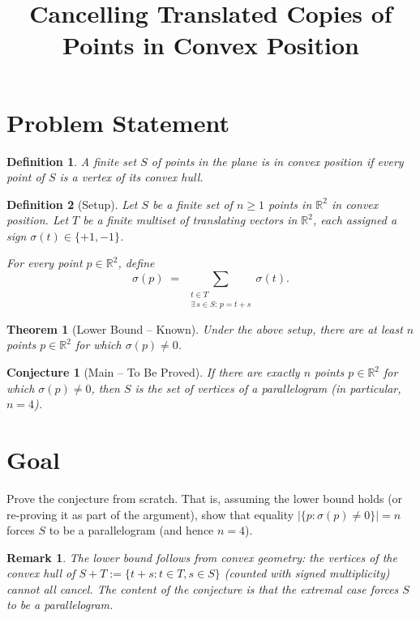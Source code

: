 \documentclass{article}
\title{Cancelling Translated Copies of Points in Convex Position}
\date{}
\newtheorem{theorem}{Theorem}
\newtheorem{conjecture}{Conjecture}
\newtheorem{definition}{Definition}
\newtheorem{remark}{Remark}
\begin{document}
\maketitle

\section*{Problem Statement}

\begin{definition}
A finite set $S$ of points in the plane is in \emph{convex position} if every point of $S$ is a vertex of its convex hull.
\end{definition}

\begin{definition}[Setup]
Let $S$ be a finite set of $n \geq 1$ points in $\mathbb{R}^2$ in convex position.
Let $T$ be a finite multiset of translating vectors in $\mathbb{R}^2$, each assigned a sign
$\sigma(t) \in \{+1, -1\}$.

For every point $p \in \mathbb{R}^2$, define
\[
  \sigma(p) \;=\; \sum_{\substack{t \in T \\ \exists\, s \in S: \, p = t + s}} \sigma(t).
\]
\end{definition}

\begin{theorem}[Lower Bound -- Known]
Under the above setup, there are at least $n$ points $p \in \mathbb{R}^2$ for which $\sigma(p) \neq 0$.
\end{theorem}

\begin{conjecture}[Main -- To Be Proved]
If there are exactly $n$ points $p \in \mathbb{R}^2$ for which $\sigma(p) \neq 0$, then $S$ is the set of vertices of a parallelogram (in particular, $n = 4$).
\end{conjecture}

\section*{Goal}

Prove the conjecture from scratch.  That is, assuming the lower bound holds (or re-proving it as part of the argument), show that equality $|\{p : \sigma(p) \neq 0\}| = n$ forces $S$ to be a parallelogram (and hence $n = 4$).

\begin{remark}
The lower bound follows from convex geometry: the vertices of the convex hull of $S + T := \{t + s : t \in T, s \in S\}$ (counted with signed multiplicity) cannot all cancel.  The content of the conjecture is that the extremal case forces $S$ to be a parallelogram.
\end{remark}
\end{document}

